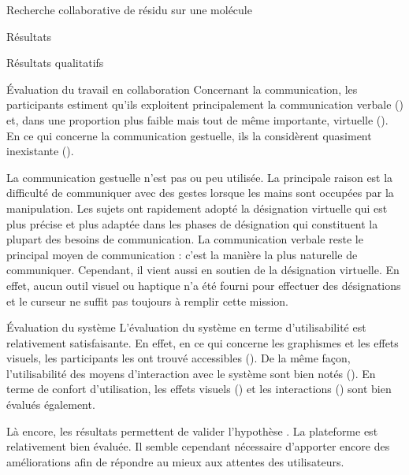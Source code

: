 \documentclass[myfrancais,ngerman,english,french]{mythesis}
\begin{document}
\begin{mychapter}{Recherche collaborative de résidu sur une molécule}
\begin{mysection}{Résultats}
\begin{mysubsection}{Résultats qualitatifs}
\begin{mysubsubsection}{Évaluation du travail en collaboration}
					Concernant la communication, les participants estiment qu'ils exploitent principalement la communication verbale () et, dans une proportion plus faible mais tout de même importante, virtuelle ().
					En ce qui concerne la communication gestuelle, ils la considèrent quasiment inexistante ().

					La communication gestuelle n'est pas ou peu utilisée.
					La principale raison est la difficulté de communiquer avec des gestes lorsque les mains sont occupées par la manipulation.
					Les sujets ont rapidement adopté la désignation virtuelle qui est plus précise et plus adaptée dans les phases de désignation qui constituent la plupart des besoins de communication.
					La communication verbale reste le principal moyen de communication : c'est la manière la plus naturelle de communiquer.
					Cependant, il vient aussi en soutien de la désignation virtuelle.
					En effet, aucun outil visuel ou haptique n'a été fourni pour effectuer des désignations et le curseur ne suffit pas toujours à remplir cette mission.
				\end{mysubsubsection}
				\begin{mysubsubsection}{Évaluation du système}
					L'évaluation du système en terme d'utilisabilité est relativement satisfaisante.
					En effet, en ce qui concerne les graphismes et les effets visuels, les participants les ont trouvé accessibles ().
					De la même façon, l'utilisabilité des moyens d'interaction avec le système sont bien notés ().
					En terme de confort d'utilisation, les effets visuels () et les interactions () sont bien évalués également.

					Là encore, les résultats permettent de valider l'hypothèse .
					La plateforme est relativement bien évaluée.
					Il semble cependant nécessaire d'apporter encore des améliorations afin de répondre au mieux aux attentes des utilisateurs.


\end{mysubsubsection}
\end{mysubsection}
\end{mysection}
\end{mychapter}
\end{document}
